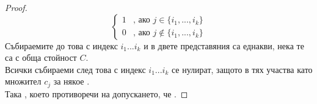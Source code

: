 \begin{proof}
\begin{equation*}
\begin{cases}
            1 & \text{, ако } j \in \{i_1, ..., i_k\} \\
            0 & \text{, ако } j \not \in \{i_1, ..., i_k\}
          \end{cases}       
    \end{equation*}
    Събираемите до това с индекс \({i_1...i_k}\) и в двете представяния са еднакви, нека те са с обща 
    стойност \(C\). \\
    Всички събираеми след това с индекс \({i_1...i_k}\) се нулират, защото в тях участва като множител 
    \(c_j\) за някое . \\
    Така , което противоречи на 
    допускането, че .
\end{proof}

